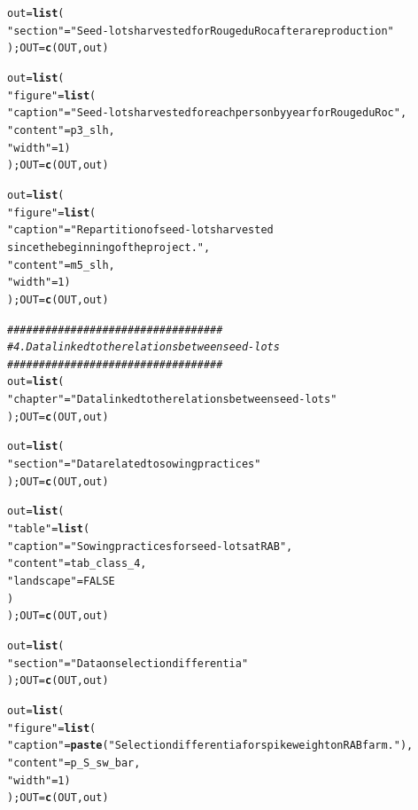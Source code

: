 \documentclass{article}\usepackage[]{graphicx}\usepackage[]{color}
\makeatletter
\newcommand{\hlnum}[1]{\textcolor[rgb]{0.686,0.059,0.569}{#1}}%
\newcommand{\hlstr}[1]{\textcolor[rgb]{0.192,0.494,0.8}{#1}}%
\newcommand{\hlcom}[1]{\textcolor[rgb]{0.678,0.584,0.686}{\textit{#1}}}%
\newcommand{\hlstd}[1]{\textcolor[rgb]{0.345,0.345,0.345}{#1}}%
\newcommand{\hlkwb}[1]{\textcolor[rgb]{0.69,0.353,0.396}{#1}}%
\newcommand{\hlkwd}[1]{\textcolor[rgb]{0.737,0.353,0.396}{\textbf{#1}}}%
\newenvironment{kframe}{%
 \def\at@end@of@kframe{}%
 \ifinner\ifhmode%
  \def\at@end@of@kframe{\end{minipage}}%
  \begin{minipage}{\columnwidth}%
 \fi\fi%
 \def\FrameCommand##1{\hskip\@totalleftmargin \hskip-\fboxsep
 \colorbox{shadecolor}{##1}\hskip-\fboxsep
     \hskip-\linewidth \hskip-\@totalleftmargin \hskip\columnwidth}%
 \MakeFramed {\advance\hsize-\width
   \@totalleftmargin\z@ \linewidth\hsize
   \@setminipage}}%
 {\par\unskip\endMakeFramed%
 \at@end@of@kframe}
\newenvironment{knitrout}{}{} %
\makeatother
\begin{document}
\begin{knitrout}
\begin{kframe}
\begin{alltt}
\hlstd{out} \hlkwb{=} \hlkwd{list}\hlstd{(}
        \hlstr{"section"} \hlstd{=} \hlstr{"Seed-lots harvested for Rouge du Roc after a reproduction"}
        \hlstd{); OUT} \hlkwb{=} \hlkwd{c}\hlstd{(OUT, out)}

\hlstd{out} \hlkwb{=} \hlkwd{list}\hlstd{(}
        \hlstr{"figure"} \hlstd{=} \hlkwd{list}\hlstd{(}
                \hlstr{"caption"} \hlstd{=} \hlstr{"Seed-lots harvested for each person by year for Rouge du Roc"}\hlstd{,}
                \hlstr{"content"} \hlstd{= p3_slh,}
                \hlstr{"width"} \hlstd{=} \hlnum{1}\hlstd{)}
        \hlstd{); OUT} \hlkwb{=} \hlkwd{c}\hlstd{(OUT, out)}

\hlstd{out} \hlkwb{=} \hlkwd{list}\hlstd{(}
        \hlstr{"figure"} \hlstd{=} \hlkwd{list}\hlstd{(}
                \hlstr{"caption"} \hlstd{=} \hlstr{"Repartition of seed-lots harvested 
		since the beginning of the project."}\hlstd{,}
                \hlstr{"content"} \hlstd{= m5_slh,}
                \hlstr{"width"} \hlstd{=} \hlnum{1}\hlstd{)}
        \hlstd{); OUT} \hlkwb{=} \hlkwd{c}\hlstd{(OUT, out)}


\hlcom{##################################}
\hlcom{# 4. Data linked to the relations between seed-lots}
\hlcom{##################################}
\hlstd{out} \hlkwb{=} \hlkwd{list}\hlstd{(}
        \hlstr{"chapter"} \hlstd{=} \hlstr{"Data linked to the relations between seed-lots"}
        \hlstd{); OUT} \hlkwb{=} \hlkwd{c}\hlstd{(OUT, out)}


\hlstd{out} \hlkwb{=} \hlkwd{list}\hlstd{(}
        \hlstr{"section"} \hlstd{=} \hlstr{"Data related to sowing practices"}
        \hlstd{); OUT} \hlkwb{=} \hlkwd{c}\hlstd{(OUT, out)}

\hlstd{out} \hlkwb{=} \hlkwd{list}\hlstd{(}
        \hlstr{"table"} \hlstd{=} \hlkwd{list}\hlstd{(}
                \hlstr{"caption"} \hlstd{=} \hlstr{"Sowing practices for seed-lots at RAB"}\hlstd{,}
                \hlstr{"content"} \hlstd{= tab_class_4,}
                \hlstr{"landscape"} \hlstd{=} \hlnum{FALSE}
                \hlstd{)}
        \hlstd{); OUT} \hlkwb{=} \hlkwd{c}\hlstd{(OUT, out)}


\hlstd{out} \hlkwb{=} \hlkwd{list}\hlstd{(}
        \hlstr{"section"} \hlstd{=} \hlstr{"Data on selection differentia"}
        \hlstd{); OUT} \hlkwb{=} \hlkwd{c}\hlstd{(OUT, out)}

\hlstd{out} \hlkwb{=} \hlkwd{list}\hlstd{(}
        \hlstr{"figure"} \hlstd{=} \hlkwd{list}\hlstd{(}
                \hlstr{"caption"} \hlstd{=} \hlkwd{paste}\hlstd{(}\hlstr{"Selection differentia for spike weight on RAB farm."}\hlstd{),}
                \hlstr{"content"} \hlstd{= p_S_sw_bar,}
                \hlstr{"width"} \hlstd{=} \hlnum{1}\hlstd{)}
        \hlstd{); OUT} \hlkwb{=} \hlkwd{c}\hlstd{(OUT, out)}


\end{alltt}
\end{kframe}
\end{knitrout}
\end{document}

